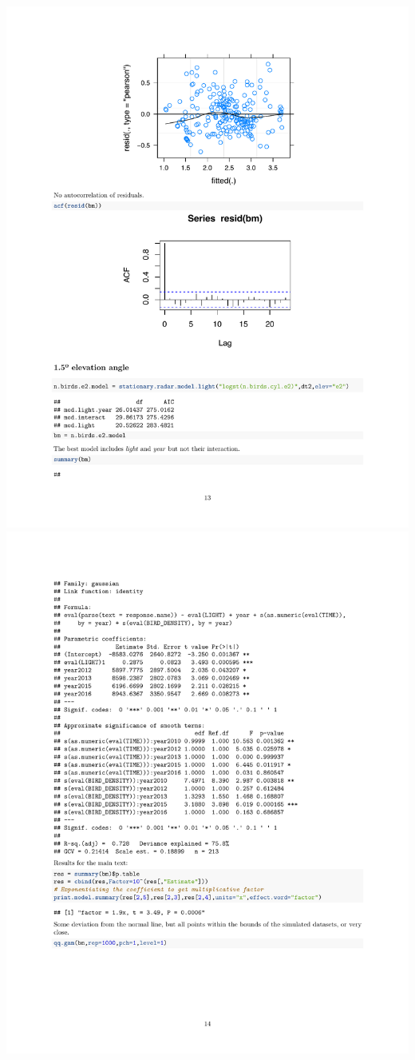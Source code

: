 \documentclass[a4paper, twoside]{templates/ociamthesis}
\begin{document}
\includegraphics[width=1\linewidth]{pdf_chapters/lights/lights_supp_crop_Part47}
\includegraphics[width=1\linewidth]{pdf_chapters/lights/lights_supp_crop_Part48}
\end{document}
